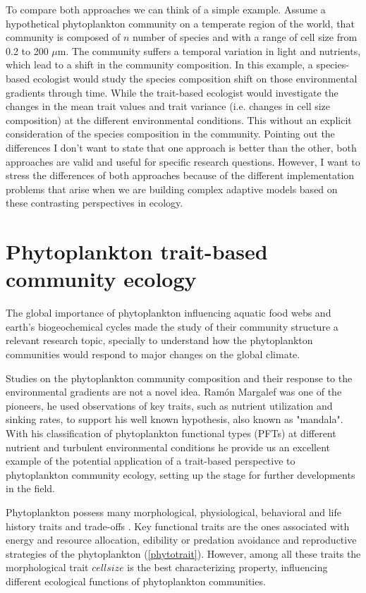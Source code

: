 To compare both approaches we can think of a simple example. Assume a hypothetical phytoplankton community on a temperate region of the world, that community is composed of $n$ number of species and with a range of cell size from 0.2 to 200 $\mu$m. The community suffers a temporal variation in light and nutrients, which lead to a shift in the community composition. In this example, a species-based ecologist would study the species composition shift on those environmental gradients through time. While the trait-based ecologist would investigate the changes in the mean trait values and trait variance (i.e. changes in cell size composition) at the different environmental conditions. This without an explicit consideration of the species composition in the community. Pointing out the differences I don't want to state that one approach is better than the other, both approaches are valid and useful for specific research questions. However, I want to stress the differences of both approaches because of the different implementation problems that arise when we are building complex adaptive models based on these contrasting perspectives in ecology.

\section{Phytoplankton trait-based community ecology}
The global importance of phytoplankton influencing aquatic food webs and earth's biogeochemical cycles \citep{Falkowski1998} made the study of their community structure a relevant research topic, specially to understand how the phytoplankton communities would respond to major changes on the global climate. 

Studies on the phytoplankton community composition and their response to the environmental gradients are not a novel idea. Ramón Margalef \citeyearpar{Margalef1978} was one of the pioneers, he used observations of key traits, such as nutrient utilization and sinking rates, to support his well known hypothesis, also known as "mandala". With his classification of phytoplankton functional types (PFTs) at different nutrient and turbulent environmental conditions he provide us an excellent example of the potential application of a trait-based perspective to phytoplankton community ecology, setting up the stage for further developments in the field.

Phytoplankton possess many morphological, physiological, behavioral and life history traits and trade-offs \citep{Litchman2008, Litchman2010}. Key functional traits are the ones associated with energy and resource allocation, edibility or predation avoidance and reproductive strategies of the phytoplankton (\ref{phytotrait}). However, among all these traits the morphological trait $cell size$ is the best characterizing property, influencing different ecological functions of phytoplankton communities. 

